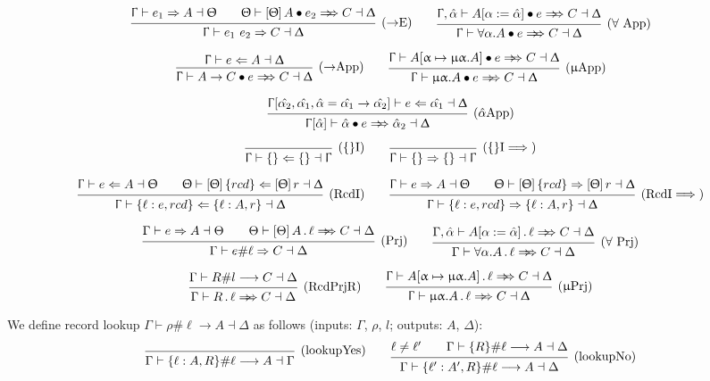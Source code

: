 \documentclass{article}
\newcommand{\rcd}[1]{\{#1\}}
\newcommand{\recursive}[2]{\upmu {#1}. {#2}}
\newcommand{\tpvar}{\upalpha}
\newcommand{\spc}{\qquad}
\newcommand{\ctx}{\Upgamma}
\newcommand{\ctxalt}{\Updelta}
\newcommand{\ctxaltt}{\Uptheta}
\newcommand{\lbl}{\ell}
\newcommand{\row}{r}
\newcommand{\tp}{A}
\newcommand{\ev}{\hat}
\newcommand{\ctxinout}[3]{#1 \vdash #2 \dashv #3}
\newcommand{\synth}[4]{\ctxinout {#1} {#2 \Rightarrow #3} {#4}}
\renewcommand{\check}[4]{\ctxinout {#1} {#2 \Leftarrow #3} {#4}}
\newcommand{\synthesizes}{\Rightarrow \!\!\! \Rightarrow}
\newcommand{\presynth}[6]{\ctxinout {#1} {#2 #3 #4 \synthesizes #5} {#6}}
\newcommand{\app}{\bullet}
\newcommand{\prjSymbol}{.}
\newcommand{\prj}{\,\prjSymbol\,}
\newcommand{\apply}[1]{\left[#1\right]}
\newcommand{\lookup}[5]{#1 \vdash #2 \# #3 \longrightarrow #4 \dashv #5}
\newcommand{\deduct}[3][]
{
  \begin{prooftree}
    \hypo{#2}
    \infer1[\text{#1}]{#3}
  \end{prooftree}
}
\begin{document}
\[
  \deduct[(\(\to\)E)]
  { \synth{\ctx}{e_1}{A}{\ctxaltt} \spc \presynth{\ctxaltt}{\apply\ctxaltt A}{\app}{e_2}{C}{\ctxalt} }
  { \synth{\ctx}{e_1 \ e_2}{C}{\ctxalt}  }
  \spc
  \deduct[(\(\forall\) App)]
  { \presynth{\ctx, \ev\alpha}{A[\alpha := \ev\alpha]}{\app}{e}{C}{\ctxalt} }
  { \presynth{\ctx}{\forall \alpha. A}{\app}{e}{C}{\ctxalt} }
\]

\[
  \deduct[(\(\to\)App)]
    { \check{\ctx}{e}{A}{\ctxalt} }
    { \presynth{\ctx}{A \to C}{\app}{e}{C}{\ctxalt} }
  \spc
  \deduct[(\(\upmu\)App)]
    { \presynth{\ctx}{\tp[\tpvar \mapsto \recursive \tpvar \tp]}{\app}{e}{C}{\ctxalt} }
    { \presynth{\ctx}{\recursive \tpvar \tp}{\app}{e}{C}{\ctxalt} }
\]


\[
  \deduct[(\(\ev\alpha\)App)]
    {
      \check{\ctx[\ev{\alpha_2}, \ev{\alpha_1}, \ev \alpha = \ev{\alpha_1} \to
        \ev{\alpha_2}]}{e}{\ev{\alpha_1}}{\ctxalt}
    }
    { \presynth{\ctx[\ev\alpha]}{\ev\alpha}{\app}{e}{\ev\alpha_2}{\ctxalt} }
\]


\[
\deduct[(\{\}I)]{}{\check{\ctx}{\{\}}{\{\}}{\ctx}}
\spc
\deduct[(\{\}I\(\implies\))]{}{\synth{\ctx}{\{\}}{\{\}}{\ctx}}
\]

\[
  \deduct[(RcdI)]
  { \check{\ctx}{e}{A}{\ctxaltt} \spc \check{\ctxaltt}{\apply\ctxaltt \rcd {rcd}}{\apply\ctxaltt\row}{\ctxalt} }
  { \check{\ctx}{\{\lbl : e , rcd \}}{\{\lbl : A, \row\}}{\ctxalt} }
  \spc
  \deduct[(RcdI\(\implies\))]
  { \synth{\ctx}{e}{A}{\ctxaltt} \spc \synth{\ctxaltt}{\apply\ctxaltt \rcd
        {rcd}}{\apply\ctxaltt \row}{\ctxalt} }
  { \synth{\ctx}{\{\lbl : e , rcd \}}{\{\lbl : A, \row\}}{\ctxalt} }
\]

\[
  \deduct[(Prj)]
  { \synth{\Gamma}{e}{A}{\Theta} \spc
    \presynth{\Theta}{\apply\Theta A}{\prj}{\lbl}{C}{\Delta}
  }
  { \synth{\Gamma}{e\#\lbl}{C}{\Delta} }
  \spc
  \deduct[(\(\forall\) Prj)]
  { \presynth{\Gamma, \ev\alpha}{A[\alpha := \ev\alpha]}{\prj}{\lbl}{C}{\Delta} }
  { \presynth{\Gamma}{\forall \alpha. A}{\prj}{\lbl}{C}{\Delta} }
\]

\[
  \deduct[(RcdPrjR)]
    { \lookup{\Gamma}{R}{l}{C}{\Delta} }
    { \presynth{\Gamma}{R}{\prj}{\lbl}{C}{\Delta} }
  \spc
  \deduct[(\(\upmu\)Prj)]
    { \presynth{\ctx}{\tp[\tpvar \mapsto \recursive \tpvar \tp]}{\prj}{\lbl}{C}{\ctxalt} }
    { \presynth{\ctx}{\recursive \tpvar \tp}{\prj}{\lbl}{C}{\ctxalt} }
\]

\noindent
We define record lookup $\lookup{\Gamma}{\rho}{\lbl}{A}{\Delta}$ as follows (inputs: $\Gamma$, $\rho$, $l$; outputs: $A$, $\Delta$):
\[
\deduct[(lookupYes)]{}{\lookup{\Gamma}{\{\lbl : A, R\}}{\lbl}{A}{\Gamma}}
\spc
\deduct[(lookupNo)]
  {\lbl \neq \lbl' \spc \lookup{\Gamma}{\{R\}}{\lbl}{A}{\Delta}}
  {\lookup{\Gamma}{\{\lbl' : A', R\}}{\lbl}{A}{\Delta}}
\]
\end{document}
